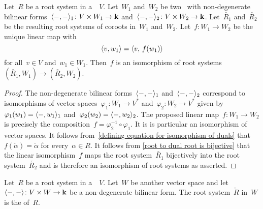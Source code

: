\begin{lemma}
  \label{uniqueness of dual}
  Let~$R$ be a root system in a~{\vectorspace{$\kf$}}~$V$.
  Let~$W_1$ and~$W_2$ be two~{\vectorspaces{$\kf$}} with non-degenerate bilinear forms~$\langle-,-\rangle_1 \colon V \times W_1 \to \mathbf{k}$ and~$\langle-,-\rangle_2 \colon V \times W_2 \to \mathbf{k}$.
  Let~$\check{R_1}$ and~$\check{R_2}$ be the resulting root systems of coroots in~$W_1$ and~$W_2$.
  Let~$f \colon W_1 \to W_2$ be the unique linear map with
  \begin{equation}
    \label{defining equation for isomorphism of duals}
    \langle v, w_1\rangle
    =
    \langle v, \, f(w_1)\rangle
  \end{equation}
  for all~$v \in V$ and~$w_1 \in W_1$.
  Then~$f$ is an isomorphism of root systems~$(\check{R_1}, W_1) \to (\check{R_2}, W_2)$.
\end{lemma}


\begin{proof}
  The non-degenerate bilinear forms~$\langle-,-\rangle_1$ and~$\langle-,-\rangle_2$ correspond to isomorphisms of vector spaces~$\varphi_1 \colon W_1 \to V^*$ and~$\varphi_2 \colon W_2 \to V^*$ given by~$\varphi_1(w_1) = \langle-, w_1\rangle_1$ and~$\varphi_2(w_2) = \langle-, w_2\rangle_2$.
  The proposed linear map~$f \colon W_1 \to W_2$ is precisely the composition~$f = \varphi_2^{-1} \circ \varphi_1$.
  It is is particular an isomorphism of vector spaces.
  It follows from~\eqref{defining equation for isomorphism of duals} that~$f(\check{\alpha}) = \check{\alpha}$ for every~$\alpha \in R$.
  It follows from \cref{root to dual root is bijective} that the linear isomorphism~$f$ maps the root system~$\check{R_1}$ bijectively into the root system~$\check{R_2}$ and is therefore an isomorphism of root systems as asserted.
\end{proof}


\begin{definition}
  Let~$R$ be a root system in a~{\vectorspace{$\kf$}}~$V$.
  Let~$W$ be another vector space and let~$\langle-,-\rangle \colon V \times W \to \mathbf{k}$ be a non-degenerate bilinear form.
  The root system~$\check{R}$ in~$W$ is the  of~$R$.
\end{definition}


